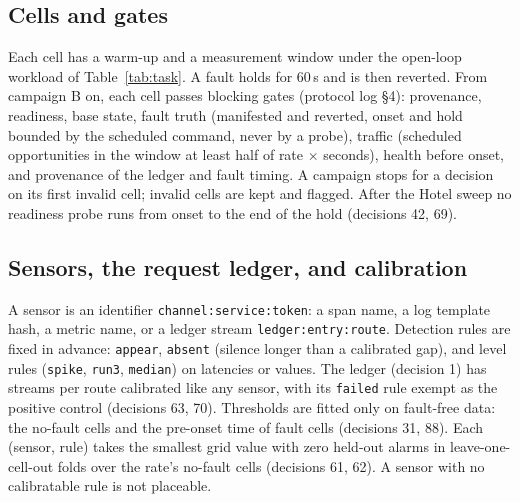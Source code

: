 \documentclass{ceurart}
\begin{document}
\subsection{Cells and gates}\label{sec:gates}
Each cell has a warm-up and a measurement window under the open-loop workload of Table~\ref{tab:task}. A fault holds for 60\,s and is then reverted. From campaign B on, each cell passes blocking gates
(protocol log \S4): provenance,
readiness, base state, fault truth (manifested and reverted, onset and
hold bounded by the scheduled command, never by a probe), traffic (scheduled opportunities in the window at least half
of rate $\times$ seconds), health before onset, and provenance of the ledger and fault timing. A campaign stops for a
decision on its first invalid cell; invalid cells are kept and flagged. After the Hotel sweep no readiness probe runs
from onset to the end of the hold (decisions 42, 69).

\subsection{Sensors, the request ledger, and calibration}\label{sec:sensors}
A sensor is an identifier \texttt{channel:service:token}: a span name, a log template hash, a metric name, or a
ledger stream \texttt{ledger:entry:route}. Detection rules are fixed in advance: \texttt{appear}, \texttt{absent}
(silence longer than a calibrated gap), and level rules (\texttt{spike}, \texttt{run3}, \texttt{median}) on latencies
or values. The ledger (decision 1) has streams per route calibrated like any sensor, with its \texttt{failed} rule exempt as the positive control (decisions 63, 70). Thresholds are fitted only
on fault-free data: the no-fault cells and the pre-onset time of fault cells (decisions 31, 88). Each (sensor, rule) takes
the smallest grid value with zero held-out alarms in leave-one-cell-out folds over the rate's no-fault cells
(decisions 61, 62). A sensor with no calibratable rule is not placeable.
\end{document}

